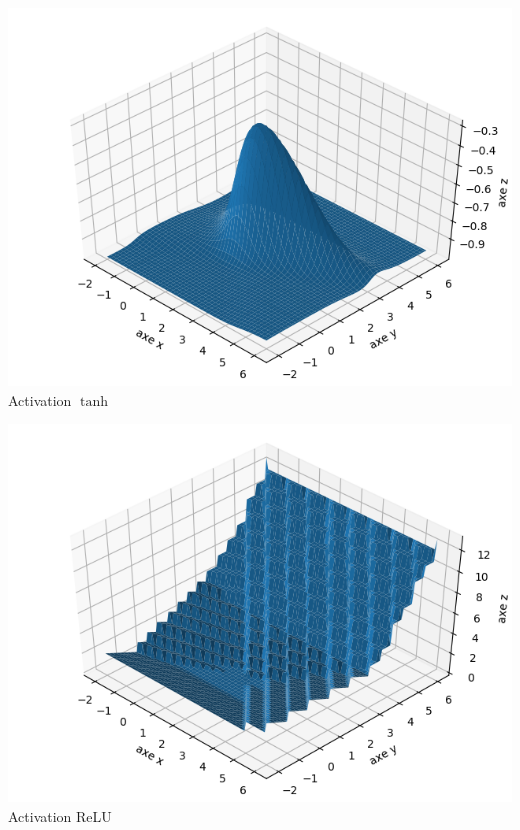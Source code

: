 \begin{exemple}{}{}
	\begin{center}
		\begin{minipage}{0.4\textwidth}
			\center
			\includegraphics[scale=\myscale,scale=0.4]{figures/neurones-surface-2-tanh}
			Activation $\tanh$
		\end{minipage}\quad
		\begin{minipage}{0.4\textwidth}
			\center
			\includegraphics[scale=\myscale,scale=0.4]{figures/neurones-surface-2-relu}
			Activation ReLU
		\end{minipage}
	\end{center}
\end{exemple}




